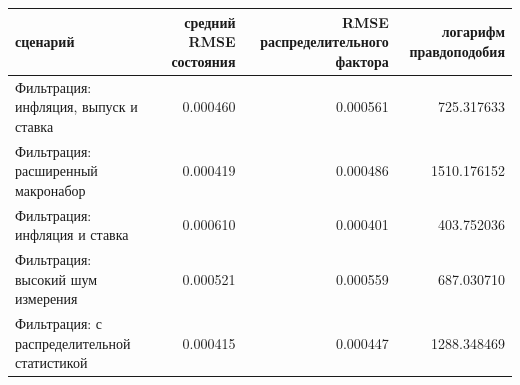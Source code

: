 \begin{tabular}{lrrr}
\toprule
сценарий & средний RMSE состояния & RMSE распределительного фактора & логарифм правдоподобия \\
\midrule
Фильтрация: инфляция, выпуск и ставка & 0.000460 & 0.000561 & 725.317633 \\
Фильтрация: расширенный макронабор & 0.000419 & 0.000486 & 1510.176152 \\
Фильтрация: инфляция и ставка & 0.000610 & 0.000401 & 403.752036 \\
Фильтрация: высокий шум измерения & 0.000521 & 0.000559 & 687.030710 \\
Фильтрация: с распределительной статистикой & 0.000415 & 0.000447 & 1288.348469 \\
\bottomrule
\end{tabular}
